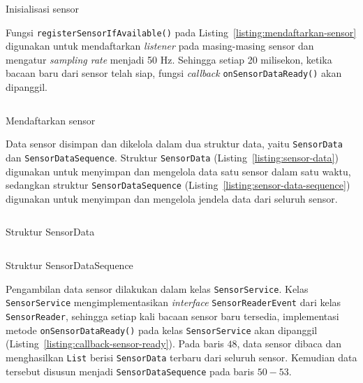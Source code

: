 \begin{listing}[h]
    \inputminted[firstline=14,firstnumber=14,lastline=32]{java}{../aktvtas/app/src/main/java/org/elins/aktvtas/sensor/SensorReader.java}
    \caption{Inisialisasi sensor}
    \label{listing:inisialisasi-sensor}
\end{listing}

Fungsi \texttt{registerSensorIfAvailable()} pada Listing~\ref{listing:mendaftarkan-sensor} digunakan untuk mendaftarkan \textit{listener} pada masing-masing sensor dan mengatur \textit{sampling rate} menjadi 50 Hz. Sehingga setiap 20 milisekon, ketika bacaan baru dari sensor telah siap, fungsi \textit{callback} \texttt{onSensorDataReady()} akan dipanggil.

\begin{listing}[h]
    \inputminted[firstline=38,firstnumber=38,lastline=44,gobble=4]{java}{../aktvtas/app/src/main/java/org/elins/aktvtas/sensor/SensorReader.java}
    \caption{Mendaftarkan sensor}
    \label{listing:mendaftarkan-sensor}
\end{listing}

Data sensor disimpan dan dikelola dalam dua struktur data, yaitu \texttt{SensorData} dan \texttt{SensorDataSequence}. Struktur \texttt{SensorData} (Listing~\ref{listing:sensor-data}) digunakan untuk menyimpan dan mengelola data satu sensor dalam satu waktu, sedangkan struktur \texttt{SensorDataSequence} (Listing~\ref{listing:sensor-data-sequence}) digunakan untuk menyimpan dan mengelola jendela data dari seluruh sensor.

\begin{listing}[h]
    \inputminted[firstline=6,firstnumber=6,lastline=16]{java}{../aktvtas/app/src/main/java/org/elins/aktvtas/sensor/SensorData.java}
    \caption{Struktur SensorData}
    \label{listing:sensor-data}
\end{listing}

\begin{listing}[h]
    \inputminted[firstline=9,firstnumber=9,lastline=13]{java}{../aktvtas/app/src/main/java/org/elins/aktvtas/sensor/SensorDataSequence.java}
    \caption{Struktur SensorDataSequence}
    \label{listing:sensor-data-sequence}
\end{listing}

Pengambilan data sensor dilakukan dalam kelas \texttt{SensorService}. Kelas \texttt{SensorService} mengimplementasikan \textit{interface} \texttt{SensorReaderEvent} dari kelas \texttt{SensorReader}, sehingga setiap kali bacaan sensor baru tersedia, implementasi metode \texttt{onSensorDataReady()} pada kelas \texttt{SensorService} akan dipanggil (Listing~\ref{listing:callback-sensor-ready}). Pada baris $48$, data sensor dibaca dan menghasilkan \texttt{List} berisi \texttt{SensorData} terbaru dari seluruh sensor. Kemudian data tersebut disusun menjadi \texttt{SensorDataSequence} pada baris $50-53$.

